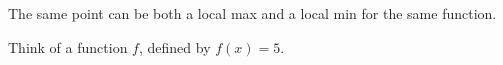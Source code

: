 \documentclass{ximera}
\author{Steven Gubkin\and Nela Lakos}
\begin{document}
\begin{exercise}

	The same point can be both a local max and a local min for the same function.
	\begin{hint}
Think of a function $f$, defined by  $f(x)=5$.
\end{hint}
	\begin{multipleChoice}	
	\end{multipleChoice}

\end{exercise}
\end{document}
